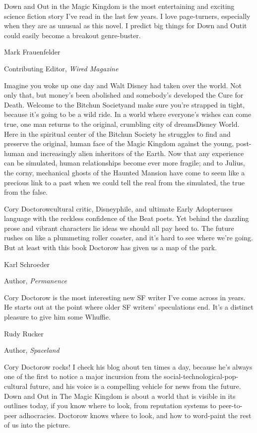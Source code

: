 Down and Out in the Magic Kingdom is the most entertaining and
exciting science fiction story I've read in the last few years. I
love page-turners, especially when they are as unusual as this
novel. I predict big things for Down and Out{\dash}it could easily become
a breakout genre-buster.

Mark Frauenfelder

Contributing Editor, \emph{Wired Magazine}

Imagine you woke up one day and Walt Disney had taken over the
world. Not only that, but money's been abolished and somebody's
developed the Cure for Death. Welcome to the Bitchun Society{\dash}and
make sure you're strapped in tight, because it's going to be a wild
ride. In a world where everyone's wishes can come true, one man
returns to the original, crumbling city of dreams{\dash}Disney World.
Here in the spiritual center of the Bitchun Society he struggles to
find and preserve the original, human face of the Magic Kingdom
against the young, post-human and increasingly alien inheritors of
the Earth. Now that any experience can be simulated, human
relationships become ever more fragile; and to Julius, the corny,
mechanical ghosts of the Haunted Mansion have come to seem like a
precious link to a past when we could tell the real from the
simulated, the true from the false.

Cory Doctorow{\dash}cultural critic, Disneyphile, and ultimate Early
Adopter{\dash}uses language with the reckless confidence of the Beat
poets. Yet behind the dazzling prose and vibrant characters lie
ideas we should all pay heed to. The future rushes on like a
plummeting roller coaster, and it's hard to see where we're going.
But at least with this book Doctorow has given us a map of the
park.

Karl Schroeder

Author, \emph{Permanence}

Cory Doctorow is the most interesting new SF writer I've come
across in years. He starts out at the point where older SF writers'
speculations end. It's a distinct pleasure to give him some
Whuffie.

Rudy Rucker

Author, \emph{Spaceland}

Cory Doctorow rocks! I check his blog about ten times a day,
because he's always one of the first to notice a major incursion
from the social-technological-pop-cultural future, and his voice is
a compelling vehicle for news from the future. Down and Out in The
Magic Kingdom is about a world that is visible in its outlines
today, if you know where to look, from reputation systems to
peer-to-peer adhocracies. Doctorow knows where to look, and how to
word-paint the rest of us into the picture.

